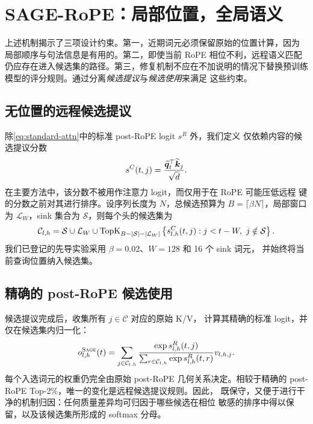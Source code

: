 \section{SAGE-RoPE：局部位置，全局语义}
\label{sec:method}

上述机制揭示了三项设计约束。第一，近期词元必须保留原始的位置计算，因为
局部顺序与句法信息是有用的。第二，即使当前 RoPE 相位不利，远程语义匹配
仍应存在进入候选集的路径。第三，修复机制不应在不加说明的情况下替换预训练
模型的评分规则。\method 通过分离\emph{候选提议}与\emph{候选使用}来满足
这些约束。

\subsection{无位置的远程候选提议}

除\cref{eq:standard-attn}中的标准 post-RoPE logit $s^R$ 外，我们定义
仅依赖内容的候选提议分数
\begin{equation}
  s^C(t,j)=\frac{\widetilde{\bm q}_t^\top\widetilde{\bm k}_j}{\sqrt d}.
  \label{eq:content-score}
\end{equation}
在主要方法中，该分数不被用作注意力 logit，而仅用于在 RoPE 可能压低远程
键的分数之前对其进行排序。设序列长度为 $N$，总候选预算为
$B=\lceil\beta N\rceil$，局部窗口为 $\mathcal L_W$，sink 集合为
$\mathcal S$，则每个头的候选集为
\begin{equation}
  \mathcal C_{l,h}
  =\mathcal S\cup\mathcal L_W\cup
  \operatorname{TopK}_{B-|\mathcal S|-|\mathcal L_W|}
  \left\{s^C_{l,h}(t,j):j<t-W,\ j\notin\mathcal S\right\}.
  \label{eq:candidate-set}
\end{equation}
我们已登记的先导实验采用 $\beta=0.02$、$W=128$ 和 16 个 sink 词元，
并始终将当前查询位置纳入候选集。

\subsection{精确的 post-RoPE 候选使用}

候选提议完成后，\methodpost 收集所有 $j\in\mathcal C$ 对应的原始 K/V，
计算其精确的标准 logit，并仅在候选集内归一化：
\begin{equation}
  o^{\textsc{Sage}}_{l,h}(t)
  =\sum_{j\in\mathcal C_{l,h}}
  \frac{\exp s^R_{l,h}(t,j)}
  {\sum_{r\in\mathcal C_{l,h}}\exp s^R_{l,h}(t,r)}v_{l,h,j}.
  \label{eq:sage-attention}
\end{equation}
每个入选词元的权重仍完全由原始 post-RoPE 几何关系决定。相较于精确的
post-RoPE Top-2\%，唯一的变化是远程候选提议规则。因此，\methodpost
既保守，又便于进行干净的机制归因：任何质量差异均可归因于哪些候选在相位
敏感的排序中得以保留，以及该候选集所形成的 softmax 分母。

